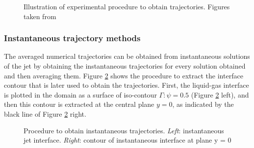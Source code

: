 \begin{figure}[ht]
     \centering
     \caption{Illustration of experimental procedure to obtain trajectories. Figures taken from }
      \label{fig:expe_obtention_of_trajectories}
\end{figure}


\subsubsection{Instantaneous trajectory methods}

The averaged numerical trajectories can be obtained from instantaneous solutions of the jet by obtaining the instantaneous trajectories for every solution obtained and then averaging them. Figure \ref{fig:trajectory_obtention_instantaneous_general} shows the procedure to extract the interface contour that is later used to obtain the trajectories. First, the liquid-gas interface is plotted in the domain as a surface of iso-contour $\Gamma: \psi = 0.5$ (Figure \ref{fig:trajectory_obtention_instantaneous_general} left), and then this contour is extracted at the central plane $y = 0$, as indicated by the black line of Figure \ref{fig:trajectory_obtention_instantaneous_general} right. 

\begin{figure}[ht]
     \centering
     \begin{subfigure}[b]{0.45\textwidth}
         \centering
     \end{subfigure}
     \begin{subfigure}[b]{0.45\textwidth}
         \centering
     \end{subfigure}
        \caption[Procedure to obtain instantaneous trajectories.]{Procedure to obtain instantaneous trajectories. \textsl{Left}: instantaneous jet interface. \textsl{Right}: contour of instantaneous interface at plane y = 0}
        \label{fig:trajectory_obtention_instantaneous_general}
\end{figure}

